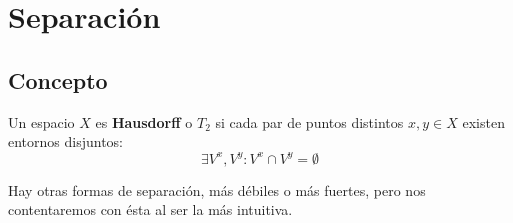 \chapter{Separación}%
\label{cha:separacion}

\section{Concepto}%
\label{sec:concepto}
\begin{defi}
Un espacio $X$ es \textbf{Hausdorff} o $T_2$ si cada par de puntos distintos $x, y \in X$ existen entornos disjuntos:
\[
\exists V^x, V^y: V^x \cap V^y = \emptyset
\]
\end{defi}
Hay otras formas de separación, más débiles o más fuertes, pero nos contentaremos con ésta al ser la más intuitiva.

